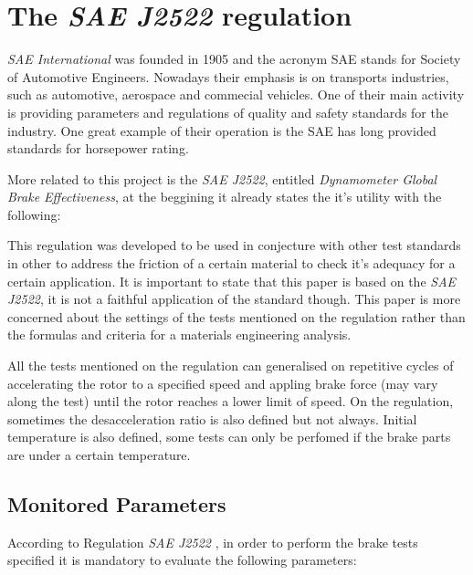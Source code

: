 \section{The \textit{SAE J2522} regulation}\label{the-sae-j2522-regulation}

		\textit{SAE International} was founded in 1905 and the acronym SAE stands for Society of Automotive Engineers. Nowadays their emphasis is on transports industries, such as automotive, aerospace and commecial vehicles. One of their main activity is providing parameters and regulations of quality and safety standards for the industry. One great example of their operation is the SAE has long provided standards for horsepower rating.
		\par
		More related to this project is the \textit{SAE J2522}, entitled \textit{Dynamometer Global Brake Effectiveness}, at the beggining it already states the it's utility with the following:


		This regulation \cite{saej2522} was developed to be used in conjecture with other test standards in other to address the friction of a certain material to check it's adequacy for a certain application. It is important to state that this paper is based on the \textit{SAE J2522}, it is not a faithful application of the standard though. This paper is more concerned about the settings of the tests mentioned on the regulation rather than the formulas and criteria for a materials engineering analysis.
		\par
		All the tests mentioned on the regulation can generalised on repetitive cycles of accelerating the rotor to a specified speed and appling brake force (may vary along the test) until the rotor reaches a lower limit of speed. On the regulation, sometimes the desacceleration ratio is also defined but not always. Initial temperature is also defined, some tests can only be perfomed if the brake parts are under a certain temperature.

		\subsection{Monitored Parameters}\label{ssec:monitored-parameters}
			According to Regulation \textit{SAE J2522} \cite{saej2522}, in order to perform the brake tests specified it is mandatory to evaluate the following parameters:

